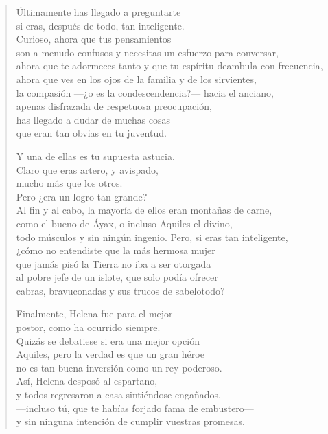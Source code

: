 \documentclass[11pt,a4paper]{article}
\begin{document}
\begin{verse}
Últimamente has llegado a preguntarte\\
si eras, después de todo, tan inteligente.\\
Curioso, ahora que tus pensamientos\\
son a menudo confusos y necesitas un esfuerzo para conversar,\\
ahora que te adormeces tanto y que tu espíritu deambula con frecuencia,\\
ahora que ves en los ojos de la familia y de los sirvientes,\\
la compasión ---¿o es la condescendencia?--- hacia el anciano,\\
apenas disfrazada de respetuosa preocupación,\\
has llegado a dudar de muchas cosas\\
que eran tan obvias en tu juventud.

Y una de ellas es tu supuesta astucia.\\
Claro que eras artero, y avispado,\\
mucho más que los otros.\\
Pero ¿era un logro tan grande?\\
Al fin y al cabo, la mayoría de ellos eran montañas de carne,\\
como el bueno de Áyax, o incluso Aquiles el divino,\\
todo músculos y sin ningún ingenio. Pero, si eras tan inteligente,\\
¿cómo no entendiste que la más hermosa mujer\\
que jamás pisó la Tierra no iba a ser otorgada\\
al pobre jefe de un islote, que solo podía ofrecer\\
cabras, bravuconadas y sus trucos de sabelotodo?

Finalmente, Helena fue para el mejor\\
postor, como ha ocurrido siempre.\\
Quizás se debatiese si era una mejor opción\\
Aquiles, pero la verdad es que un gran héroe\\
no es tan buena inversión como un rey poderoso.\\
Así, Helena desposó al espartano,\\
y todos regresaron a casa sintiéndose engañados,\\
---incluso tú, que te habías forjado fama de embustero---\\
y sin ninguna intención de cumplir vuestras promesas.
\end{verse}
\end{document}
